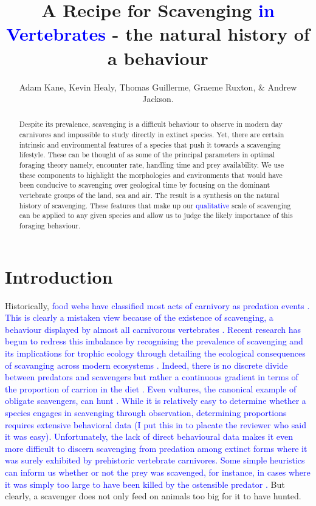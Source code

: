 \documentclass[a4paper,12pt]{article}
\title{A Recipe for Scavenging \textcolor{blue}{in Vertebrates} - the natural history of a behaviour}
\author{Adam Kane, Kevin Healy, Thomas Guillerme, Graeme Ruxton, \& Andrew Jackson.}
\begin{document}
\maketitle


\begin{abstract} 
Despite its prevalence, scavenging is a difficult behaviour to observe in modern day carnivores and impossible to study directly in extinct species. 
Yet, there are certain intrinsic and environmental features of a species that push it towards a scavenging lifestyle. 
These can be thought of as some of the principal parameters in optimal foraging theory namely, encounter rate, handling time and prey availability. 
We use these components to highlight the morphologies and environments that would have been conducive to scavenging over geological time by focusing on the dominant vertebrate groups of the land, sea and air. 
The result is a synthesis on the natural history of scavenging. 
These features that make up our \textcolor{blue}{qualitative} scale of scavenging can be applied to any given species and allow us to judge the likely importance of this foraging behaviour. 
\end{abstract}

\newpage


\section{Introduction}

Historically, \textcolor{blue}{food webs have classified most acts of carnivory as predation events \citep{wilson2011scavenging}. 
This is clearly a mistaken view because of the existence of scavenging, a behaviour displayed by almost all carnivorous vertebrates \citep{devault2003scavenging}. 
Recent research has begun to redress this imbalance by recognising the prevalence of scavenging and its implications for trophic ecology through detailing the ecological consequences of scavanging across modern ecosystems \citep{pereira2014facultative,periquet2015lion}.
Indeed, there is no discrete divide between predators and scavengers but rather a continuous gradient in terms of the proportion of carrion in the diet \citep{pereira2014facultative}.
Even vultures, the canonical example of obligate scavengers, can hunt \citep{margalida2011scavenger}. While it is relatively easy to determine whether a species engages in scavenging through observation, determining proportions requires extensive behavioral data (I put this in to placate the reviewer who said it was easy).
Unfortunately, the lack of direct behavioural data makes it even more difficult to discern scavenging from predation among extinct forms where it was surely exhibited by prehistoric vertebrate carnivores.
Some simple heuristics can inform us whether or not the prey was scavenged, for instance, in cases where it was simply too large to have been killed by the ostensible predator \citep{pobiner2008paleoecological}.}
But clearly, a scavenger does not only feed on animals too big for it to have hunted.
\end{document}
